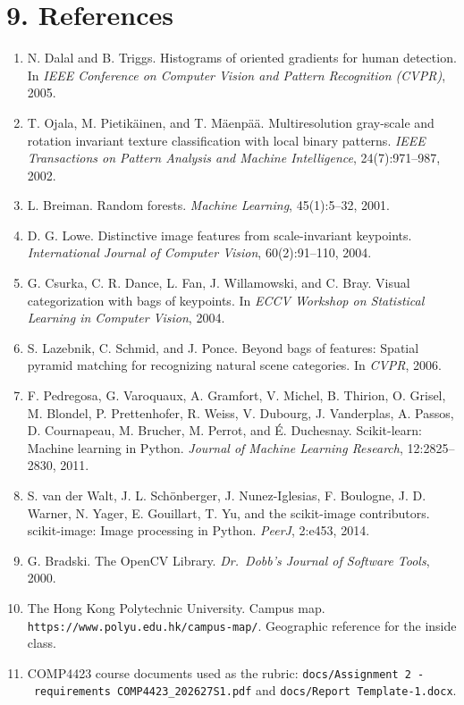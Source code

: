 \documentclass[11pt,a4paper]{article}
\providecommand{\tightlist}{%
  \setlength{\itemsep}{0pt}\setlength{\parskip}{0pt}}
\begin{document}
\section{9. References}\label{references}

\begin{enumerate}
\def\labelenumi{\arabic{enumi}.}
\tightlist
\item
  N. Dalal and B. Triggs. Histograms of oriented gradients for human detection. In \emph{IEEE Conference on Computer Vision and Pattern Recognition (CVPR)}, 2005.
\item
  T. Ojala, M. Pietikäinen, and T. Mäenpää. Multiresolution gray-scale and rotation invariant texture classification with local binary patterns. \emph{IEEE Transactions on Pattern Analysis and Machine Intelligence}, 24(7):971--987, 2002.
\item
  L. Breiman. Random forests. \emph{Machine Learning}, 45(1):5--32, 2001.
\item
  D. G. Lowe. Distinctive image features from scale-invariant keypoints. \emph{International Journal of Computer Vision}, 60(2):91--110, 2004.
\item
  G. Csurka, C. R. Dance, L. Fan, J. Willamowski, and C. Bray. Visual categorization with bags of keypoints. In \emph{ECCV Workshop on Statistical Learning in Computer Vision}, 2004.
\item
  S. Lazebnik, C. Schmid, and J. Ponce. Beyond bags of features: Spatial pyramid matching for recognizing natural scene categories. In \emph{CVPR}, 2006.
\item
  F. Pedregosa, G. Varoquaux, A. Gramfort, V. Michel, B. Thirion, O. Grisel, M. Blondel, P. Prettenhofer, R. Weiss, V. Dubourg, J. Vanderplas, A. Passos, D. Cournapeau, M. Brucher, M. Perrot, and É. Duchesnay. Scikit-learn: Machine learning in Python. \emph{Journal of Machine Learning Research}, 12:2825--2830, 2011.
\item
  S. van der Walt, J. L. Schönberger, J. Nunez-Iglesias, F. Boulogne, J. D. Warner, N. Yager, E. Gouillart, T. Yu, and the scikit-image contributors. scikit-image: Image processing in Python. \emph{PeerJ}, 2:e453, 2014.
\item
  G. Bradski. The OpenCV Library. \emph{Dr.~Dobb's Journal of Software Tools}, 2000.
\item
  The Hong Kong Polytechnic University. Campus map. \texttt{https:/\allowbreak{}/\allowbreak{}www.polyu.edu.hk/\allowbreak{}campus-\allowbreak{}map/\allowbreak{}}. Geographic reference for the inside class.
\item
  COMP4423 course documents used as the rubric: \texttt{docs/\allowbreak{}Assignment\ 2\ -\allowbreak{}\ requirements\ COMP4423\_\allowbreak{}202627S1.pdf} and \texttt{docs/\allowbreak{}Report\ Template-\allowbreak{}1.docx}.
\end{enumerate}
\end{document}
